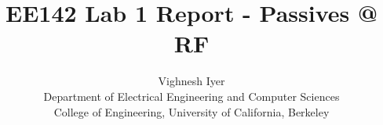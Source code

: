 \documentclass[11pt]{article}
\begin{document}
\title{EE142 Lab 1 Report - Passives @ RF}

\author{Vighnesh Iyer \\
Department of Electrical Engineering and Computer Sciences\\
College of Engineering, University of California, Berkeley}
\date{}
\maketitle

\section{}
\end{document}
